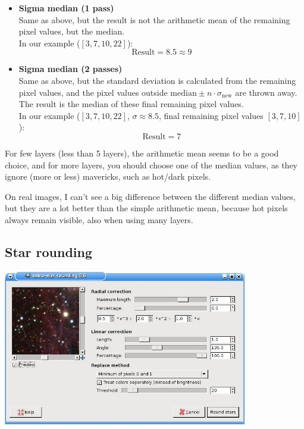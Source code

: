 \documentclass[a4paper]{article}
\begin{document}
\begin{itemize}
\item \textbf{Sigma median (1 pass)} \\
Same as above, but the result is not the arithmetic mean of the remaining pixel values, but the median. \\
In our example ($[3,7,10,22]$):
$$\mathrm{Result} = 8.5 \approx 9$$

\item \textbf{Sigma median (2 passes)} \\
Same as above, but the standard deviation is calculated from the remaining pixel values, and the pixel values outside $\mathrm{median} \pm n \cdot \sigma_{\mathrm{new}}$ are thrown away.
The result is the median of these final remaining pixel values. \\
In our example ($[3,7,10,22]$, $\sigma \approx 8.5$, final remaining pixel values $[3,7,10]$):
$$\mathrm{Result} = 7$$

\end{itemize}

For few layers (less than 5 layers), the arithmetic mean seems to be a good choice, and for more layers, you should choose one of the median values, as they ignore (more or less) mavericks, such as hot/dark pixels.

On real images, I can't see a big difference between the different median values, but they are a lot better than the simple arithmetic mean, because hot pixels always remain visible, also when using many layers.

\subsection{Star rounding}

\begin{center}\includegraphics[width=0.8\textwidth]{star_rounding.jpg}\end{center}
\end{document}
